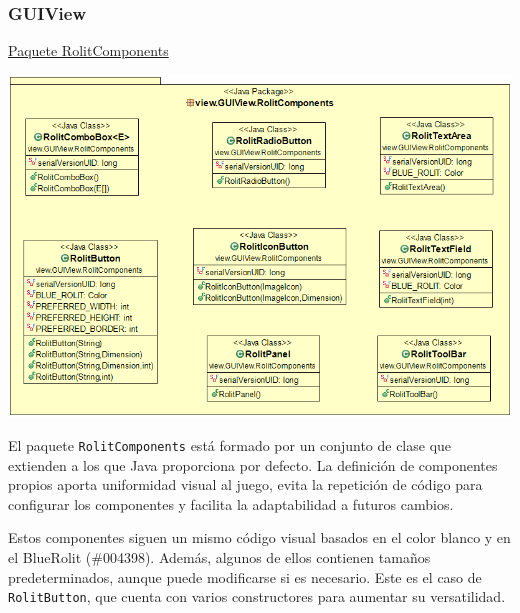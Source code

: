 \documentclass[12pt,a4paper,openright]{book}
\theoremstyle{break}
\begin{document}
\subsubsection{GUIView}
\underline{Paquete RolitComponents}
\begin{center}
\includegraphics[scale=0.5]{RolitComponents.png} 
\end{center}

El paquete \texttt{RolitComponents} está formado por un conjunto de clase que extienden a los que Java proporciona por defecto. La definición de componentes propios aporta uniformidad visual al juego, evita la repetición de código para configurar los componentes y facilita la adaptabilidad a futuros cambios.

Estos componentes siguen un mismo código visual basados en el color blanco y en el BlueRolit (\#004398). Además, algunos de ellos contienen tamaños predeterminados, aunque puede modificarse si es necesario. Este es el caso de \texttt{RolitButton}, que cuenta con varios constructores para aumentar su versatilidad.
\end{document}

